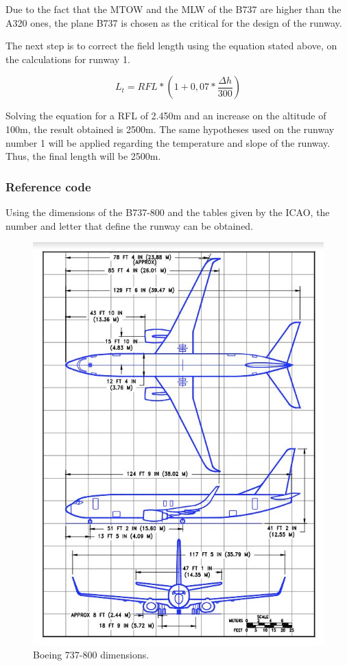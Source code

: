 		Due to the fact that the MTOW and the MLW of the B737 are higher than the A320 ones, the plane B737 is chosen as the critical for the design of the runway. 		
		
		The next step is to correct the field length using the equation stated above, on the calculations for runway 1. 
	
		\[L_t=RFL*(1+0,07*\frac{\Delta h}{300})\]
		
		Solving the equation for a RFL of 2.450m and an increase on the altitude of 100m, the result obtained is 2500m.
		The same hypotheses used on the runway number 1 will be applied regarding the temperature and slope of the runway.  Thus, the final length will be 2500m.
		
		\subsubsection{Reference code}
		Using the dimensions of the B737-800 and the tables given by the ICAO, the number and letter that define the runway can be obtained. 
		
		\begin{figure}[H]
			\centering
			\includegraphics[clip, trim=0cm 0cm 0cm 0cm, width=1\textwidth]{./images/B737/737}
			\caption{Boeing 737-800 dimensions.} %
			\label{} %
		\end{figure}
	
